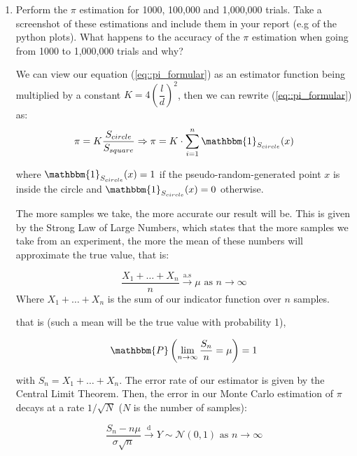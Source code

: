 \documentclass[12pt,letterpaper]{report}
\begin{document}
\begin{enumerate}
		\item
		Perform the $\pi$ estimation for 1000, 100,000 and 1,000,000 trials. Take a screenshot of these estimations and include them in your report (e.g of the python plots). What happens to the accuracy of the $\pi$ estimation when going from 1000 to 1,000,000 trials and why?
		
		We can view our equation (\ref{eq::pi_formular}) as an estimator function being multiplied by a constant $K= 4 \left( \dfrac{l}{d} \right)^{2}$, then we can rewrite (\ref{eq::pi_formular}) as: 
		\begin{equation*}
		\pi = K \dfrac{S_{circle}}{S_{square}}
		\Rightarrow
		\pi = K \cdot \sum_{i=1}^{n}{ \mathbbm{1}_{S_{circle}} (x)  } 
		\end{equation*}
		
		where $\mathbbm{1}_{S_{circle}}(x) = 1$ if the pseudo-random-generated point $x$ is inside the circle and  $\mathbbm{1}_{S_{circle}} (x)= 0$ otherwise. 
		
		The more samples we take, the more accurate our result will be. This is given by the Strong Law of Large Numbers, which states that the more samples we take from an experiment, the more the mean of these numbers will approximate the true value, that is:
		
		\begin{equation*}
		\dfrac{X_{1} + \dots + X_{n} }{n} \xrightarrow[{ }]{\text{a.s}} \mu \text{ as } n \rightarrow \infty
		\end{equation*}
		Where $X_{1} + \dots + X_{n}  $ is the sum of our indicator function over $n$ samples. 
		
		that is (such a mean will be the true value with probability 1), 
		
		\begin{equation*}
		\mathbbm{P}\left( \lim_{n\rightarrow \infty} \dfrac{S_{n}}{n} = \mu \right) = 1
		\end{equation*}
		
		with $S_{n} = X_{1} + \dots + X_{n}$. The error rate of our estimator is given by the Central Limit Theorem. Then, the error in our Monte Carlo estimation of $\pi$ decays at a rate $1/ \sqrt{N}$ ($N$ is the number of samples): 
		
		\begin{equation*}
		\dfrac{S_{n} - n\mu }{ \sigma \sqrt{n} }
		\xrightarrow[{ }]{\text{d}} Y \sim \mathcal{N}(0, 1)
		\text{ as } n \rightarrow \infty
		\end{equation*}
		

\end{enumerate}
\end{document}
